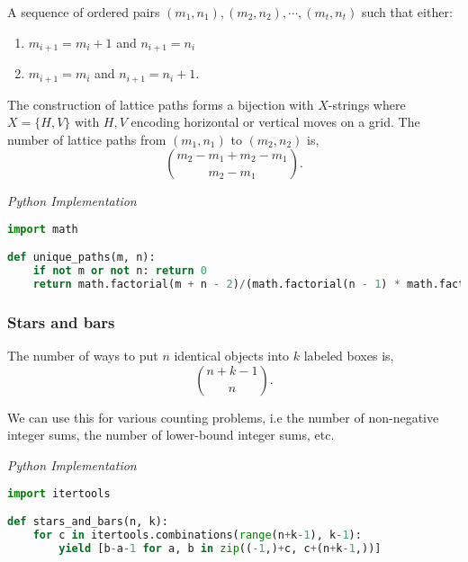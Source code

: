 \documentclass{article}
\begin{document}
    A sequence of ordered pairs $(m_1, n_1), (m_2, n_2), \cdots, (m_t, n_t)$ such that either:
    \begin{enumerate}
        \item $m_{i+1} = m_{i}+1$ and $n_{i+1} = n_{i}$
        \item $m_{i+1} = m_i$ and $n_{i+1} = n_i +1$.
    \end{enumerate}
    The construction of lattice paths forms a bijection with $X$-strings where $X = \{ H, V\}$ with $H,V$ encoding horizontal or vertical moves on a grid. The number of lattice paths from $(m_1, n_1)$ to $(m_2,n_2)$ is,
    \[
       \binom{m_2 - m_1 + m_2 - m_1}{m_2-m_1}.
    \]

\vspace{8pt} \emph{Python Implementation}
\begin{lstlisting}[language=Python]
import math

def unique_paths(m, n):
    if not m or not n: return 0
    return math.factorial(m + n - 2)/(math.factorial(n - 1) * math.factorial(m - 1))
\end{lstlisting}

    \subsubsection{Stars and bars}

    The number of ways to put $n$ identical objects into $k$ labeled boxes is,
    \[
    \binom{n+k-1}{n}.
    \]
    
    We can use this for various counting problems, i.e the number of non-negative integer sums, the number of lower-bound integer sums, etc.
    
\vspace{8pt} \emph{Python Implementation}
\begin{lstlisting}[language=Python]
import itertools

def stars_and_bars(n, k):
    for c in itertools.combinations(range(n+k-1), k-1):
        yield [b-a-1 for a, b in zip((-1,)+c, c+(n+k-1,))]

\end{lstlisting}

    
\end{document}
